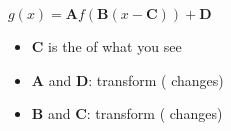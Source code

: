 \begin{tcolorbox}[center,colback=white,width=5in,]
    \centering
    $g(x) = \bm{A} f\left( \bm{B}(x-\bm{C})\right) + \bm{D}$
    \tcblower 
    \begin{itemize}[fullwidth,]
        \item {$\bm{C}$ is the  of what you see}
        \item $\bm{A}$ and $\bm{D}$: transform  ( changes)
        \item $\bm{B}$ and $\bm{C}$: transform  ( changes)
    \end{itemize}
\end{tcolorbox}


